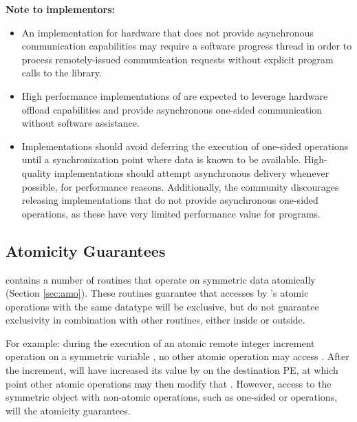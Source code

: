 \textbf{Note to implementors:}
\begin{itemize}
  \item An \openshmem implementation for hardware that does not provide
      asynchronous communication capabilities may require a software progress
      thread in order to process remotely-issued communication requests without
      explicit program calls to the \openshmem library.  
  \item High performance implementations of \openshmem are expected to leverage
      hardware offload capabilities and provide asynchronous one-sided
      communication without software assistance.
  \item Implementations should avoid deferring the execution of one-sided
      operations until a synchronization point where data is known to be
      available. High-quality implementations should attempt asynchronous delivery
      whenever possible, for performance reasons. Additionally, the \openshmem
      community discourages releasing \openshmem implementations that do not
      provide asynchronous one-sided operations, as these have very limited
      performance value for \openshmem programs.
\end{itemize}

\subsection{Atomicity Guarantees}\label{subsec:amo_guarantees}

\openshmem contains a number of routines that operate on symmetric data
atomically (Section \ref{sec:amo}).  These routines guarantee that accesses by
\openshmem's atomic operations with the same datatype will be exclusive, but do not guarantee
exclusivity in combination with other routines, either inside \openshmem or
outside.

For example: during the execution of an atomic remote integer increment
operation on a symmetric variable , no other \openshmem atomic operation
may access .  After the increment,  will have increased its value
by  on the destination \ac{PE}, at which point other atomic operations
may then modify that .  However, access to the symmetric object 
with non-atomic operations, such as one-sided  or  operations,
will  the atomicity guarantees.
